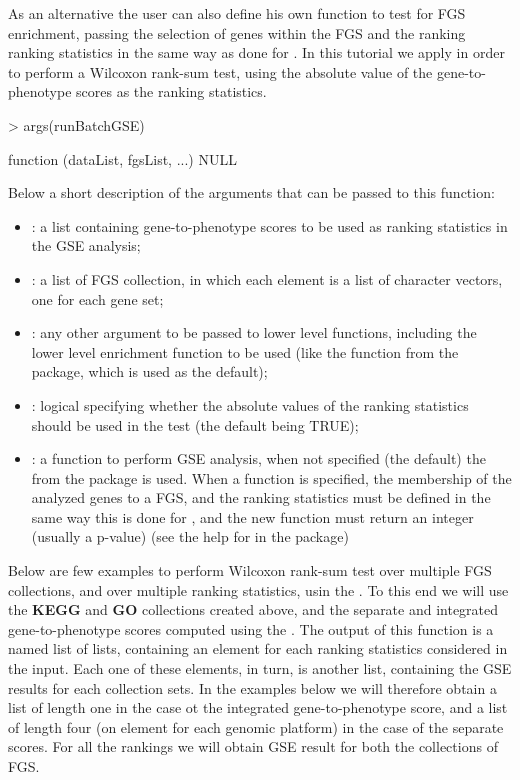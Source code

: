 \documentclass[11pt]{article}
\newcommand{\Rcode}[1]{{\texttt{\color{BrickRed}{#1}}}}
\renewenvironment{Schunk}{\vspace{\topsep}}{\vspace{\topsep}}
\begin{document}
As an alternative the user can also define his own function 
to test for FGS enrichment,
passing the selection of genes within the FGS and the ranking ranking statistics
in the same way as done for \Rcode{geneSetTest}.
In this tutorial we apply \Rcode{geneSetTest} in order to perform a
Wilcoxon rank-sum test, using the absolute value of the gene-to-phenotype scores 
as the ranking statistics.

\begin{Schunk}
\begin{Sinput}
> args(runBatchGSE)
\end{Sinput}
\begin{Soutput}
function (dataList, fgsList, ...) 
NULL
\end{Soutput}
\end{Schunk}

Below a short description of the arguments that can be passed to this function:
\begin{itemize}
 \item \Rcode{dataList}: a list containing gene-to-phenotype scores to be used
   as ranking statistics in the GSE analysis;
 \item \Rcode{fgsList}: a list of FGS collection, in which each element is a list of character vectors,
   one for each gene set;
 \item \Rcode{...}: any other argument to be passed to lower level functions, including 
   the lower level  enrichment function to be used (like the \Rcode{geneSetTest} function
   from the \Rcode{limma} package, which is used as the default);
 \item \Rcode{absolute}: logical specifying whether the absolute values of the ranking statistics 
   should be used in the test (the default being TRUE);
 \item \Rcode{gseFunc}: a function to perform GSE analysis, when not specified (the default) the
   \Rcode{geneSetTest} from the \Rcode{limma} package is used. When a function is specified,
   the membership of the analyzed genes to a FGS, and the ranking statistics must be defined in the
   same way this is done for \Rcode{geneSetTest}, and the new function must
   return an integer (usually a p-value) (see the help for \Rcode{geneSetTest}
   in the \Rcode{limma} package)
 \end{itemize}

Below are few examples to perform Wilcoxon rank-sum test over multiple FGS collections,
and over multiple ranking statistics, usin the \Rcode{runBatchGSE}.
To this end we will use the {\bf KEGG} and {\bf GO} collections created above,
and the separate and integrated gene-to-phenotype scores computed using the
\Rcode{computeDrStat}.
The output of this function is a named list of lists, containing an element for each
ranking statistics considered in the input. Each one of these elements, in turn,
is another list, containing the GSE results for each collection sets.
In the examples below we will therefore obtain a list of length one in the case
ot the integrated gene-to-phenotype score, and a list of length four
(on element for each genomic platform) in the case of the separate scores.
For all the rankings we will obtain GSE result for both the collections of FGS.
\end{document}
